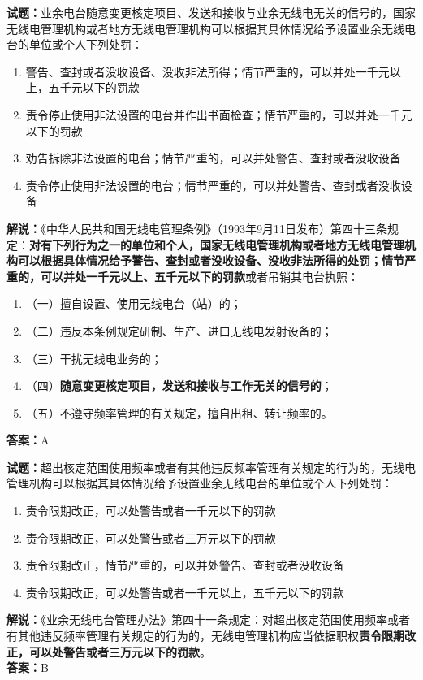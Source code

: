 \documentclass{ctexbook}
\begin{document}
\noindent\textbf{试题：}业余电台随意变更核定项目、发送和接收与业余无线电无关的信号的，国家无线电管理机构或者地方无线电管理机构可以根据其具体情况给予设置业余无线电台的单位或个人下列处罚：
\begin{enumerate}[leftmargin=3em]
  \item  警告、查封或者没收设备、没收非法所得；情节严重的，可以并处一千元以上，五千元以下的罚款
  \item  责令停止使用非法设置的电台并作出书面检查；情节严重的，可以并处一千元以下的罚款
  \item  劝告拆除非法设置的电台；情节严重的，可以并处警告、查封或者没收设备
  \item  责令停止使用非法设置的电台；情节严重的，可以并处警告、查封或者没收设备
\end{enumerate}
\noindent\textbf{解说：}《中华人民共和国无线电管理条例》（1993年9月11日发布）第四十三条规定：\textbf{对有下列行为之一的单位和个人，国家无线电管理机构或者地方无线电管理机构可以根据具体情况给予警告、查封或者没收设备、没收非法所得的处罚；情节严重的，可以并处一千元以上、五千元以下的罚款}或者吊销其电台执照：
\begin{enumerate}[leftmargin=3em, label=]
  \item（一）擅自设置、使用无线电台（站）的；
  \item（二）违反本条例规定研制、生产、进口无线电发射设备的；
  \item（三）干扰无线电业务的；
  \item（四）\textbf{随意变更核定项目，发送和接收与工作无关的信号的}；
  \item（五）不遵守频率管理的有关规定，擅自出租、转让频率的。
\end{enumerate}
\textbf{答案：}A

\vspace{\baselineskip}

\noindent\textbf{试题：}超出核定范围使用频率或者有其他违反频率管理有关规定的行为的，无线电管理机构可以根据其具体情况给予设置业余无线电台的单位或个人下列处罚：
\begin{enumerate}[leftmargin=3em]
  \item 责令限期改正，可以处警告或者一千元以下的罚款
  \item 责令限期改正，可以处警告或者三万元以下的罚款
  \item 责令限期改正，情节严重的，可以并处警告、查封或者没收设备
  \item 责令限期改正，可以处警告或者一千元以上，五千元以下的罚款
\end{enumerate}
\noindent\textbf{解说：}《业余无线电台管理办法》第四十一条规定：对超出核定范围使用频率或者有其他违反频率管理有关规定的行为的，无线电管理机构应当依据职权\textbf{责令限期改正，可以处警告或者三万元以下的罚款}。\\\textbf{答案：}B
\end{document}
